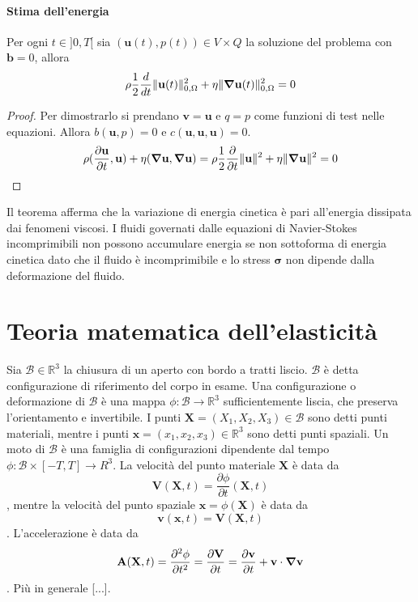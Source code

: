 \paragraph{Stima dell'energia}
\begin{theorem}
Per ogni $t \in ]0,T[$ sia $(\mathbf{u}(t),p(t)) \in V \times Q$ la soluzione del problema con $\mathbf{b}=0$, allora
$$\rho \frac{1}{2} \frac{d}{dt} \Vert \mathbf{u} (t) \Vert^2_{0,\Omega} + \eta \Vert \boldsymbol{\nabla} \mathbf{u} (t) \Vert^2_{0,\Omega} = 0$$
\end{theorem}
\begin{proof}
Per dimostrarlo si prendano $\mathbf{v}=\mathbf{u}$ e $q=p$ come funzioni di test nelle equazioni. Allora $b(\mathbf{u},p)=0$ e $c(\mathbf{u},\mathbf{u},\mathbf{u})=0$.
$$
\rho\ps{\frac{\partial \mathbf{u}}{\partial t}}{\mathbf{u}}+\eta\ps{\Nabla\mathbf{u}}{\Nabla\mathbf{u}} = 
\rho\frac{1}{2}\frac{\partial} {\partial t}\Vert\mathbf{u}\Vert^2+\eta\Vert \Nabla\mathbf{u}\Vert^2 = 0
$$
\end{proof}
Il teorema afferma che la variazione di energia cinetica è pari all'energia dissipata dai fenomeni viscosi.
I fluidi governati dalle equazioni di Navier-Stokes incomprimibili non possono accumulare energia se non sottoforma di energia cinetica dato che il fluido è incomprimibile e lo stress $\boldsymbol{\sigma}$ non dipende dalla deformazione del fluido. 

\section{Teoria matematica dell'elasticità}
Sia $\mathcal{B} \in \mathbb{R}^3$ la chiusura di un aperto con bordo a tratti liscio. $\mathcal{B}$ è detta configurazione di riferimento del corpo in esame.
Una configurazione o deformazione di $\mathcal{B}$ è una mappa $\phi: \mathcal{B} \to \mathbb{R}^3$ sufficientemente liscia, che preserva l'orientamento e invertibile. I punti $\mathbf{X}=(X_1,X_2,X_3) \in \mathcal{B}$ sono detti punti materiali, mentre i punti $\mathbf{x}=(x_1,x_2,x_3) \in \mathbb{R}^3$ sono detti punti spaziali. 
Un moto di $\mathcal{B}$ è una famiglia di configurazioni dipendente dal tempo $\phi: \mathcal{B} \times [-T,T] \to R^3$.
La velocità del punto materiale $\mathbf{X}$ è data da 
$$\mathbf{V}(\mathbf{X},t) = \frac{\partial \phi}{\partial t}(\mathbf{X},t)$$,
mentre la velocità del punto spaziale $\mathbf{x}=\phi(\mathbf{X})$ è data da
$$\mathbf{v}(\mathbf{x},t) = \mathbf{V}(\mathbf{X},t)$$.
L'accelerazione è data da
$$\mathbf{A}(\mathbf{X},t) = \frac{\partial^2 \phi}{\partial t^2} = \frac{\partial \mathbf{V}}{\partial t} = \frac{\partial \mathbf{v}}{\partial t}+\mathbf{v}\cdot\boldsymbol{\nabla}\mathbf{v}$$.
Più in generale [...].
